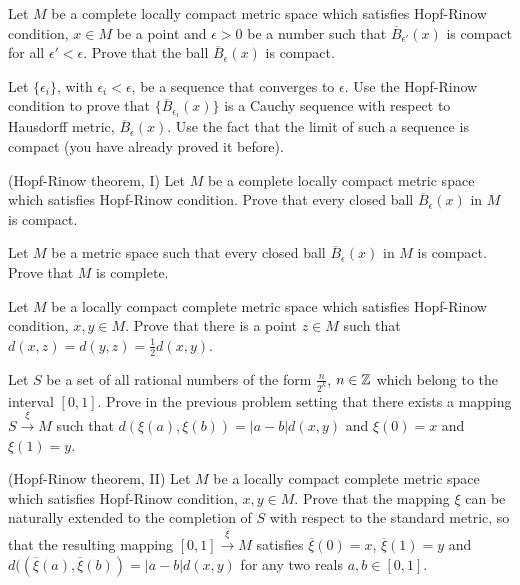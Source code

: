 \documentclass[12pt]{article}
\begin{document}
\begin{zadacha}[*] Let $M$ be a complete locally compact metric space
  which satisfies Hopf-Rinow condition,
$x\in M$ be a point and $\epsilon>0$ be a number such that $\overline
B_{\epsilon'}(x)$ is compact for all $\epsilon'<\epsilon$.
Prove that the ball $\overline B_{\epsilon}(x)$ is compact.
\end{zadacha}

\begin{ukazanie} Let $\{\epsilon_i\}$, with $\epsilon_i<\epsilon$, 
be a sequence that
  converges to $\epsilon$. Use the Hopf-Rinow condition to prove that
  $\{\overline B_{\epsilon_i}(x)\}$ is a Cauchy sequence with respect
  to Hausdorff metric, $\overline B_{\epsilon}(x)$. Use the fact that
  the limit of such a sequence is compact (you have already proved it
  before).
\end{ukazanie}

\begin{zadacha}[*] (Hopf-Rinow theorem, I) Let $M$ be a complete
  locally compact metric space which satisfies Hopf-Rinow condition.
  Prove that every closed ball $\overline B_{\epsilon}(x)$ in $M$ is
  compact.
\end{zadacha}

\begin{zadacha} Let $M$ be a metric space such that every closed ball
  $\overline B_{\epsilon}(x)$ in $M$ is compact. Prove that $M$ is complete.
\end{zadacha}

\begin{zadacha}[*] Let $M$ be a locally compact complete metric space
  which satisfies Hopf-Rinow condition, $x, y\in M$. Prove that there
  is a point $z\in M$ such that $d(x,z) = d (y, z)= \frac 1 2 d(x,y)$.
\end{zadacha}

\begin{zadacha}[*] Let $S$ be a set of all rational numbers of the
  form $\frac{n}{2^k}$, $n\in {\mathbb Z}$ which belong to the interval
  $[0,1]$. Prove in the previous problem setting that there exists a
  mapping $S\overset \xi\to M$ such that $d(\xi(a), \xi(b)) = |a-b|
  d(x,y)$ and $\xi(0)=x$ and $\xi(1)=y$.
\end{zadacha}

\begin{zadacha}[*] (Hopf-Rinow theorem, II)   
  Let $M$ be a locally compact complete metric space which satisfies
  Hopf-Rinow condition, $x, y\in M$. Prove that the mapping $\xi$ can be
  naturally extended to the completion of $S$ with respect to the
  standard metric,  so  that the resulting mapping $[0,1]\overset
  {\overline\xi}\to M$ satisfies $\overline\xi(0)=x$,
  $\overline\xi(1)=y$ and $d((\overline\xi(a), \overline\xi(b)) = |a-b| 
  d(x,y)$ for any two reals $a,b\in [0,1]$.
\end{zadacha}
\end{document}
